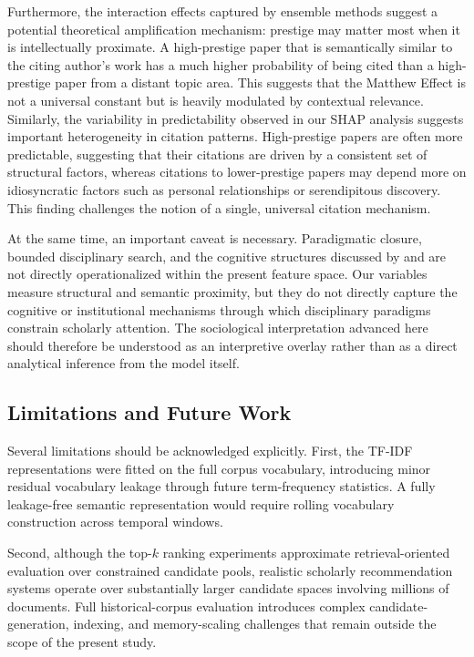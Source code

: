 \documentclass[11pt,a4paper]{article}
\begin{document}
Furthermore, the interaction effects captured by ensemble methods suggest a potential theoretical amplification mechanism: prestige may matter most when it is intellectually proximate. A high-prestige paper that is semantically similar to the citing author's work has a much higher probability of being cited than a high-prestige paper from a distant topic area. This suggests that the Matthew Effect is not a universal constant but is heavily modulated by contextual relevance. Similarly, the variability in predictability observed in our SHAP analysis suggests important heterogeneity in citation patterns. High-prestige papers are often more predictable, suggesting that their citations are driven by a consistent set of structural factors, whereas citations to lower-prestige papers may depend more on idiosyncratic factors such as personal relationships or serendipitous discovery. This finding challenges the notion of a single, universal citation mechanism.

At the same time, an important caveat is necessary. Paradigmatic closure, bounded disciplinary search, and the cognitive structures discussed by \citet{kuhn1962structure} and \citet{crane1972invisible} are not directly operationalized within the present feature space. Our variables measure structural and semantic proximity, but they do not directly capture the cognitive or institutional mechanisms through which disciplinary paradigms constrain scholarly attention. The sociological interpretation advanced here should therefore be understood as an interpretive overlay rather than as a direct analytical inference from the model itself.

\subsection{Limitations and Future Work}

Several limitations should be acknowledged explicitly. First, the TF-IDF representations were fitted on the full corpus vocabulary, introducing minor residual vocabulary leakage through future term-frequency statistics. A fully leakage-free semantic representation would require rolling vocabulary construction across temporal windows.

Second, although the top-\(k\) ranking experiments approximate retrieval-oriented evaluation over constrained candidate pools, realistic scholarly recommendation systems operate over substantially larger candidate spaces involving millions of documents. Full historical-corpus evaluation introduces complex candidate-generation, indexing, and memory-scaling challenges that remain outside the scope of the present study.
\end{document}
